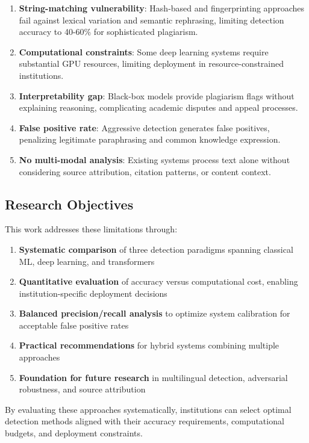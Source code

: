 \begin{enumerate}
  \item \textbf{String-matching vulnerability}: Hash-based and fingerprinting approaches fail against lexical variation and semantic rephrasing, limiting detection accuracy to 40-60\% for sophisticated plagiarism.
  
  \item \textbf{Computational constraints}: Some deep learning systems require substantial GPU resources, limiting deployment in resource-constrained institutions.
  
  \item \textbf{Interpretability gap}: Black-box models provide plagiarism flags without explaining reasoning, complicating academic disputes and appeal processes.
  
  \item \textbf{False positive rate}: Aggressive detection generates false positives, penalizing legitimate paraphrasing and common knowledge expression.
  
  \item \textbf{No multi-modal analysis}: Existing systems process text alone without considering source attribution, citation patterns, or content context.
\end{enumerate}

\subsection{Research Objectives}

This work addresses these limitations through:

\begin{enumerate}
  \item \textbf{Systematic comparison} of three detection paradigms spanning classical ML, deep learning, and transformers
  
  \item \textbf{Quantitative evaluation} of accuracy versus computational cost, enabling institution-specific deployment decisions
  
  \item \textbf{Balanced precision/recall analysis} to optimize system calibration for acceptable false positive rates
  
  \item \textbf{Practical recommendations} for hybrid systems combining multiple approaches
  
  \item \textbf{Foundation for future research} in multilingual detection, adversarial robustness, and source attribution
\end{enumerate}

By evaluating these approaches systematically, institutions can select optimal detection methods aligned with their accuracy requirements, computational budgets, and deployment constraints.
